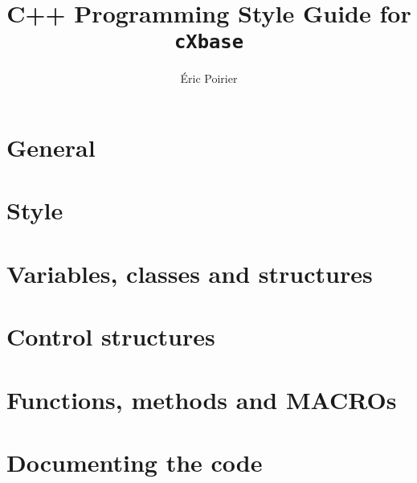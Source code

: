 \documentclass{report}
\newcommand{\files}{./files/}
\begin{document}
\title{C++ Programming Style Guide for \texttt{cXbase}}
\author{Éric Poirier}
\maketitle





\chapter{General}                              
\chapter{Style}                                
\chapter{Variables, classes and structures}    
\chapter{Control structures}                   
\chapter{Functions, methods and MACROs}        
\chapter{Documenting the code}                 
\end{document}

